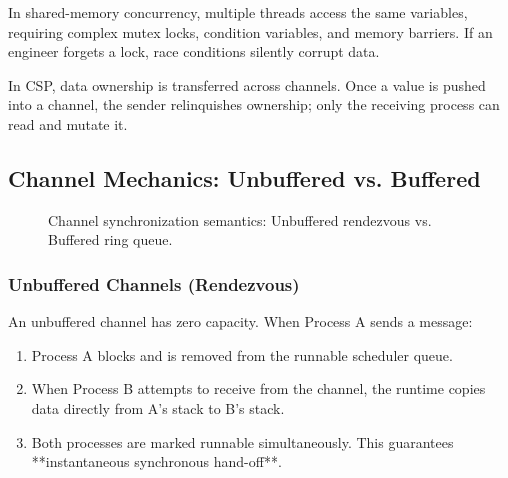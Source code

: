 In shared-memory concurrency, multiple threads access the same variables, requiring complex mutex locks, condition variables, and memory barriers. If an engineer forgets a lock, race conditions silently corrupt data.

In CSP, data ownership is transferred across channels. Once a value is pushed into a channel, the sender relinquishes ownership; only the receiving process can read and mutate it.

\subsection{Channel Mechanics: Unbuffered vs. Buffered}

\begin{figure}[htbp]
\centering
{}
\caption{Channel synchronization semantics: Unbuffered rendezvous vs. Buffered ring queue.}
\label{fig:csp-channels}
\end{figure}

\subsubsection{Unbuffered Channels (Rendezvous)}
An unbuffered channel has zero capacity. When Process A sends a message:
\begin{enumerate}[leftmargin=15pt]
  \item Process A blocks and is removed from the runnable scheduler queue.
  \item When Process B attempts to receive from the channel, the runtime copies data directly from A's stack to B's stack.
  \item Both processes are marked runnable simultaneously. This guarantees **instantaneous synchronous hand-off**.
\end{enumerate}


